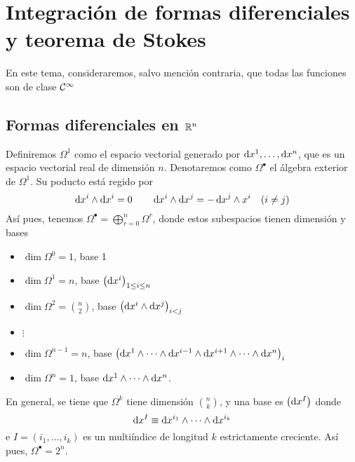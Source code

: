 \chapter{Integración de formas diferenciales y teorema de Stokes}

En este tema, consideraremos, salvo mención contraria, que todas las funciones son de clase $\mathcal{C}^\infty$

\section{Formas diferenciales en $\mathbb{R}^n$}

\begin{defi}
    Definiremos $\Omega^1$ como el espacio vectorial generado por $\dif x^1, \dots, \dif x^n$, que es un espacio vectorial real de dimensión $n$.
    Denotaremos como $\Omega^\bullet$ el álgebra exterior de $\Omega^1$. Su poducto está regido por
    \[
        \dif x^i \wedge \dif x^i = 0
        \qquad
        \dif x^i \wedge \dif x^j = -\dif x^j \wedge x^i \quad (i \neq j)
    \]
    Así pues, tenemos $\Omega^\bullet = \bigoplus\limits^{n}_{r = 0} \Omega^r$, donde estos subespacios tienen dimensión y bases
    \begin{itemize}
        \item $\dim \Omega^0 = 1$, base 1
        \item $\dim \Omega^1 = n$, base $\left( \dif x^i \right)_{1 \leq i \leq n}$
        \item $\dim \Omega^2 = \binom{n}{2}$, base $\left( \dif x^i \wedge \dif x^j \right)_{i < j}$
        \item $\vdots$
        \item $\dim \Omega^{n-1} = n$, base $\left( \dif x^1 \wedge \cdots \wedge \dif x^{i-1} \wedge \dif x^{i+1} \wedge \cdots \wedge \dif x^n \right)_i$
        \item $\dim \Omega^n = 1$, base $\dif x^1 \wedge \cdots \wedge \dif x^n$.
    \end{itemize}

    En general, se tiene que $\Omega^k$ tiene dimensión $\binom{n}{k}$, y una base es $\left( \dif x^I \right)$ donde
    \[
        \dif x^I \equiv \dif x^{i_1} \wedge \cdots \wedge \dif x^{i_k}
    \]
    e $I = \left( i_1, \dots, i_k \right)$ es un multiíndice de longitud $k$ estrictamente creciente. Así pues, $\Omega^\bullet = 2^n$.
\end{defi}

